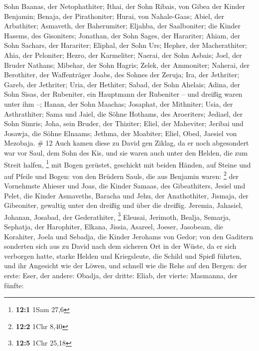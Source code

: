 Sohn Baanas, der Netophathiter;  Ithai, der Sohn Ribais,
von Gibea der Kinder Benjamin; Benaja, der Pirathoniter; 
Hurai, von Nahale-Gaas; Abiel, der Arbathiter;  Asmaveth,
der Baherumiter; Eljahba, der Saalboniter;  die Kinder
Hasems, des Gisoniters; Jonathan, der Sohn Sages, der Harariter;
 Ahiam, der Sohn Sachars, der Harariter; Eliphal, der Sohn
Urs;  Hepher, der Macherathiter; Ahia, der Peloniter;
 Hezro, der Karmeliter; Naerai, der Sohn Asbais;
 Joel, der Bruder Nathans; Mibehar, der Sohn Hagris;
 Zelek, der Ammoniter; Naherai, der Berothiter, der
Waffenträger Joabs, des Sohnes der Zeruja;  Ira, der
Jethriter; Gareb, der Jethriter;  Uria, der Hethiter;
Sabad, der Sohn Ahelais;  Adina, der Sohn Sisas, der
Rubeniter, ein Hauptmann der Rubeniter -- und dreißig waren unter ihm
--;  Hanan, der Sohn Maachas; Josaphat, der Mithniter;
 Usia, der Asthrathiter; Sama und Jaiel, die Söhne Hothams,
des Aroeriters;  Jediael, der Sohn Simris; Joha, sein
Bruder, der Thiziter;  Eliel, der Maheviter; Jeribai und
Josawja, die Söhne Elnaams; Jethma, der Moabiter;  Eliel,
Obed, Jaesiel von Mezobaja. \# 12  Auch kamen diese zu David
gen Ziklag, da er noch abgesondert war vor Saul, dem Sohn des Kis, und
sie waren auch unter den Helden, die zum Streit halfen, \footnote{\textbf{12:1}
  1Sam 27,6}  mit Bogen gerüstet, geschickt mit beiden
Händen, auf Steine und auf Pfeile und Bogen: von den Brüdern Sauls, die
aus Benjamin waren: \footnote{\textbf{12:2} 1Chr 8,40}  der
Vornehmste Ahieser und Joas, die Kinder Samaas, des Gibeathiters, Jesiel
und Pelet, die Kinder Asmaveths, Baracha und Jehu, der Anathothiter,
 Jismaja, der Gibeoniter, gewaltig unter den dreißig und
über die dreißig.  Jeremia, Jahasiel, Johanan, Josabad, der
Gederathiter, \footnote{\textbf{12:5} 1Chr 25,18}  Eleusai,
Jerimoth, Bealja, Semarja, Sephatja, der Harophiter, 
Elkana, Jissia, Asareel, Joeser, Jasobeam, die Korahiter, 
Joela und Sebadja, die Kinder Jerohams von Gedor;  von den
Gaditern sonderten sich aus zu David nach dem sicheren Ort in der Wüste,
da er sich verborgen hatte, starke Helden und Kriegsleute, die Schild
und Spieß führten, und ihr Angesicht wie der Löwen, und schnell wie die
Rehe auf den Bergen:  der erste: Eser, der andere: Obadja,
der dritte: Eliab,  der vierte: Masmanna, der fünfte:
